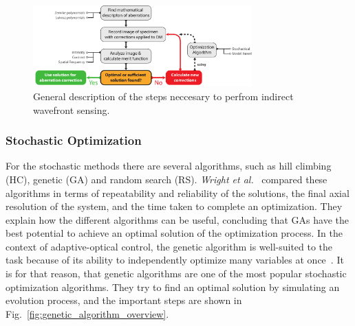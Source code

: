 \begin{figure}[htb]
	\centering
		\includegraphics[width=0.75\textwidth]{images/indirect_wavefront_sensing}
	\caption{General description of the steps neccesary to perfrom indirect wavefront sensing. }
	\label{fig:indirect_wavefront_sensing}
\end{figure}


\subsubsection{Stochastic Optimization}
\label{sec:GeneticAndRandomOptimizationMethods}

For the stochastic methods there are several algorithms, such as hill climbing (HC), genetic (GA) and random search (RS). \emph{Wright et al.}~\cite{Genetic_compared_to_others} compared these algorithms in terms of repeatability and reliability of the solutions, the final axial resolution of the system, and the time taken to complete an optimization. They explain how the different algorithms can be useful, concluding that GAs have the best potential to achieve an optimal solution of the optimization process. In the context of adaptive-optical control, the genetic algorithm is well-suited to the task because of its ability to independently optimize many variables at once~\cite{Genetic_closed_loop}. It is for that reason, that genetic algorithms are one of the most popular stochastic optimization algorithms. They try to find an optimal solution by simulating an evolution process, and the important steps are shown in Fig.~\ref{fig:genetic_algorithm_overview}. 

